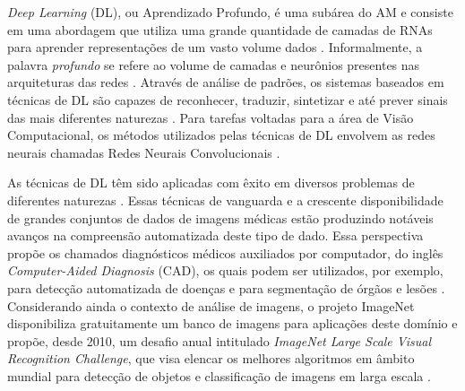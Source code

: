 \emph{Deep Learning} (DL), ou Aprendizado Profundo, é uma subárea do AM e consiste em uma abordagem que utiliza uma grande quantidade de camadas de RNAs para aprender representações de um vasto volume dados \cite{ref:chollet,ref:khan}. Informalmente, a palavra \emph{profundo} se refere ao volume de camadas e neurônios presentes nas arquiteturas das redes \cite{ref:gulli}. Através de análise de padrões, os sistemas baseados em técnicas de DL são capazes de reconhecer, traduzir, sintetizar e até prever sinais das mais diferentes naturezas \cite{ref:JAI-2017}. Para tarefas voltadas para a área de Visão Computacional, os métodos utilizados pelas técnicas de DL envolvem as redes neurais chamadas Redes Neurais Convolucionais \cite{ref:khan}. 

As técnicas de DL têm sido aplicadas com êxito em diversos problemas de diferentes naturezas \cite{ref:JAI-2017}. Essas técnicas de vanguarda e a crescente disponibilidade de grandes conjuntos de dados de imagens médicas estão produzindo notáveis avanços na compreensão automatizada deste tipo de dado. Essa perspectiva propõe os chamados diagnósticos médicos auxiliados por computador, do inglês \emph{Computer-Aided Diagnosis} (CAD), os quais podem ser utilizados, por exemplo, para detecção automatizada de doenças e para segmentação de órgãos e lesões \cite{ref:yang}. Considerando ainda o contexto de análise de imagens, o projeto ImageNet disponibiliza gratuitamente um banco de imagens para aplicações deste domínio e propõe, desde 2010, um desafio anual intitulado \emph{ImageNet Large Scale Visual Recognition Challenge}, que visa elencar os melhores algoritmos em âmbito mundial para detecção de objetos e classificação de imagens em larga escala \cite{ref:image-net}.
